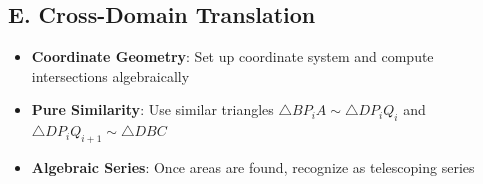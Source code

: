 \documentclass[]{article}
\begin{document}
\begin{strategicbox}
\subsection*{E. Cross-Domain Translation}
\begin{itemize}[leftmargin=*]
    \item \textbf{Coordinate Geometry}: Set up coordinate system and compute intersections algebraically
    \item \textbf{Pure Similarity}: Use similar triangles $\triangle BP_iA \sim \triangle DP_iQ_i$ and $\triangle DP_iQ_{i+1} \sim \triangle DBC$
    \item \textbf{Algebraic Series}: Once areas are found, recognize as telescoping series
\end{itemize}
\end{strategicbox}
\end{document}
